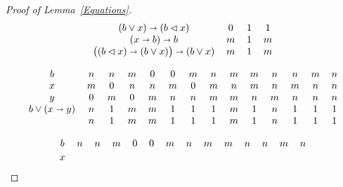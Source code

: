 \documentclass[reqno,a4paper]{amsart}
\theoremstyle{remark}
\theoremstyle{definition}
\newcommand{\iimplies}{\shortrightarrow}
\begin{document}
\begin{proof}[Proof of Lemma~\ref{Equations}]
\begin{table}
\[\begin{tabular}{c c c c}
				\((b\vee x)\iimplies (b\lhd x)\)                                &
				\(0\)                                                           & \(1\) & \(1\) \\
				\((x\iimplies b)\iimplies b\)                                   &
				\(m\)                                                           & \(1\) & \(m\) \\
				\(\bigl((b\lhd x)\iimplies (b\vee x)\bigr)\iimplies (b\vee x)\) &
				\(m\)                                                           & \(1\) & \(m\) \\
			\end{tabular}
		\]
		\caption{Identities (3) and (4) of Lemma~\ref{Equations}}\label{Table 2}
	\end{table}
	\begin{table}
		\[
			\begin{tabular}{c c c c c c c c c c c c c c}
				\(b\)                    & \(n\) & \(n\) & \(m\) & \(0\) & \(0\) & \(m\) & \(n\) & \(m\) & \(m\) & \(n\) & \(n\) & \(m\) & \(n\) \\
				\(x\)                    & \(m\) & \(0\) & \(n\) & \(n\) & \(m\) & \(0\) & \(m\) & \(n\) & \(m\) & \(n\) & \(m\) & \(n\) & \(n\) \\
				\(y\)                    & \(0\) & \(m\) & \(0\) & \(m\) & \(n\) & \(n\) & \(m\) & \(m\) & \(n\) & \(m\) & \(n\) & \(n\) & \(n\) \\
				\(b\vee (x\iimplies y)\) &
				\(n\)                    & \(1\) & \(m\) & \(m\) & \(1\) & \(1\) & \(1\) & \(m\) & \(1\) & \(n\) & \(1\) & \(1\) & \(1\)         \\
				                         &
				\(n\)                    & \(1\) & \(m\) & \(m\) & \(1\) & \(1\) & \(1\) & \(m\) & \(1\) & \(n\) & \(1\) & \(1\) & \(1\)         \\
			\end{tabular}
		\]
		\caption{Identity (5) of Lemma~\ref{Equations}; here the last line represents \((((b\lhd x) \iimplies (b\lhd y)) \iimplies (b \vee x)) \iimplies (((b\lhd y) \iimplies (b\lhd x))\iimplies (b \vee y))\)}\label{Table 3}
	\end{table}
	\begin{table}
		\[
			\begin{tabular}{c c c c c c c c c c c c c c}
				\(b\)                         &
				\(n\)                         & \(n\) & \(m\) & \(0\) & \(0\) & \(m\) & \(n\) & \(m\) & \(m\) & \(n\) & \(n\) & \(m\) & \(n\) \\[2pt]
				\(x\)                         &

\end{tabular}\]
\end{table}
\end{proof}
\end{document}
